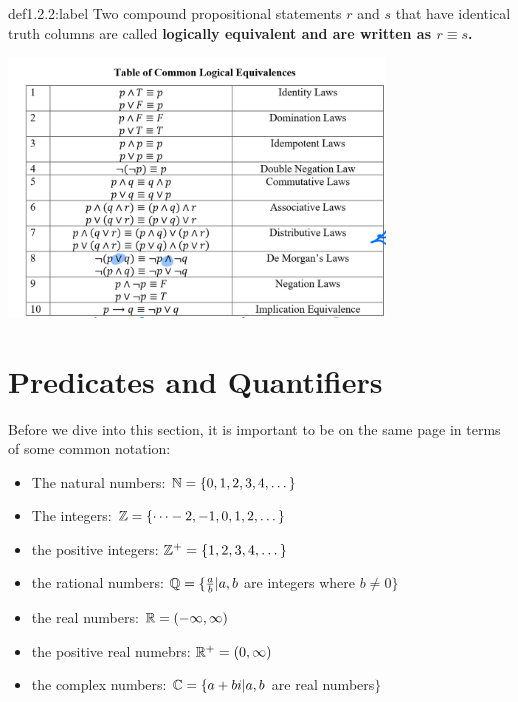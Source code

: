 \begin{definition}{def1.2.2:label}
    Two compound propositional statements $r$ and $s$ that have identical truth columns are called \bf{logically equivalent} and are written as $r \equiv s$.
\end{definition}


\begin{center}
    \includegraphics[width=0.75\textwidth]{chapters/ch1/images/fig1.2.1.PNG}
\end{center}



\section{Predicates and Quantifiers}

Before we dive into this section, it is important to be on the same page in terms of some common notation:

\begin{itemize}
    \item The natural numbers: $\mathbb{N} = \{0,1,2,3,4,\dots\}$
    \item The integers: $\mathbb{Z} = \{\dots -2, -1, 0, 1, 2, \dots\}$
    \item the positive integers: $\mathbb{Z}^+ = \{1,2,3,4,\dots\}$
    \item the rational numbers: $\mathbb{Q} = \{\frac{a}{b} | a, b $ are integers where $ b \ne 0\}$
    \item the real numbers: $\mathbb{R} = (-\infty, \infty)$
    \item the positive real numebrs: $\mathbb{R}^+ = (0, \infty)$
    \item the complex numbers: $\mathbb{C} = \{a+bi | a,b $ are real numbers$\}$
\end{itemize}